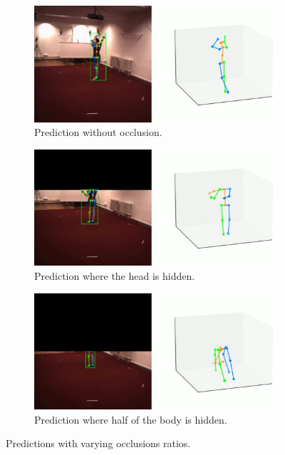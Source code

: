 \documentclass[runningheads]{llncs}
\begin{document}
\begin{figure}[ht]
  \centering
  \begin{subfigure}[t]{0.49\textwidth}
    \centering
    \includegraphics[width=\textwidth]{assets/pred_no_occlusion.png}
    \caption{Prediction without occlusion.}
    \label{fig: no occlusion}
  \end{subfigure}
  \hfill
  \begin{subfigure}[t]{0.49\textwidth}
    \centering
    \includegraphics[width=\textwidth]{assets/pred_head_hidden.png}
    \caption{Prediction where the head is hidden.}
    \label{fig: head hidden}
  \end{subfigure}
  \hfill
  \begin{subfigure}[t]{0.49\textwidth}
    \centering
    \includegraphics[width=\textwidth]{assets/pred_spider.png}
    \caption{Prediction where half of the body is hidden.}
    \label{fig: spider}
  \end{subfigure}
  \caption{Predictions with varying occlusions ratios.}
  \label{fig: predictions varying occlusion ratios}
\end{figure}
\end{document}
